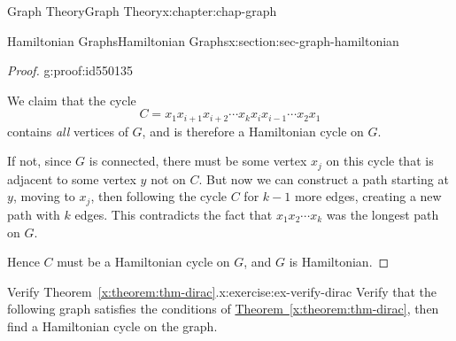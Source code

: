 \documentclass[oneside,10pt,]{book}
\newcommand{\xreffont}{\relax}
\numberwithin{equation}{section}
\begin{document}
\begin{chapterptx}{Graph Theory}{}{Graph Theory}{}{}{x:chapter:chap-graph}
\begin{sectionptx}{Hamiltonian Graphs}{}{Hamiltonian Graphs}{}{}{x:section:sec-graph-hamiltonian}
\begin{proof}{}{g:proof:id550135}
\begin{sidebyside}{1}{0.2}{0.2}{0}
\begin{sbspanel}{0.6}
{
}%
\end{sbspanel}%
\end{sidebyside}%
\par
We claim that the cycle%
\begin{equation*}
C = x_1x_{i+1}x_{i+2} \cdots x_kx_ix_{i-1}\cdots x_2x_1
\end{equation*}
contains \emph{all} vertices of \(G\), and is therefore a Hamiltonian cycle on \(G\).%
\par
If not, since \(G\) is connected, there must be some vertex \(x_j\) on this cycle that is adjacent to some vertex \(y\) not on \(C\). But now we can construct a path starting at \(y\), moving to \(x_j\), then following the cycle \(C\) for \(k-1\) more edges, creating a new path with \(k\) edges. This contradicts the fact that \(x_1x_2\cdots x_k\) was the longest path on \(G\).%
\par
Hence \(C\) must be a Hamiltonian cycle on \(G\), and \(G\) is Hamiltonian.%
\end{proof}
\begin{inlineexercise}{Verify Theorem~{\xreffont\ref*{x:theorem:thm-dirac}}.}{x:exercise:ex-verify-dirac}%
Verify that the following graph satisfies the conditions of \hyperref[x:theorem:thm-dirac]{Theorem~{\xreffont\ref{x:theorem:thm-dirac}}}, then find a Hamiltonian cycle on the graph.%
\begin{sidebyside}{1}{0.325}{0.325}{0}%
\begin{sbspanel}{0.35}%
\end{sbspanel}
\end{sidebyside}
\end{inlineexercise}
\end{sectionptx}
\end{chapterptx}
\end{document}
